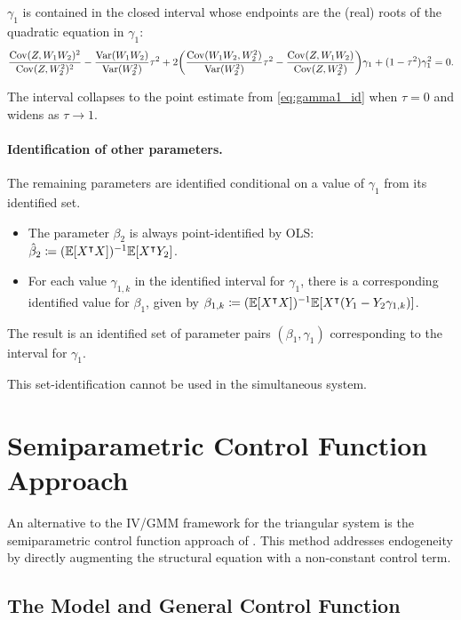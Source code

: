 \begin{theorem} \label{thm:bounds}
$\gamma_{1}$ is contained in the closed interval whose endpoints
are the (real) roots of the quadratic equation in $\gamma_{1}$:
\[
\frac{\operatorname{Cov}(Z,W_{1}W_{2})^{2}}{\operatorname{Cov}(Z,W_{2}^{2})^{2}}-\frac{\operatorname{Var}(W_{1}W_{2})}{\operatorname{Var}(W_{2}^{2})}\tau^{2}+2\!\left(\frac{\operatorname{Cov}(W_{1}W_{2},W_{2}^{2})}{\operatorname{Var}(W_{2}^{2})}\tau^{2}-\frac{\operatorname{Cov}(Z,W_{1}W_{2})}{\operatorname{Cov}(Z,W_{2}^{2})}\right)\!\gamma_{1}+(1-\tau^{2})\gamma_{1}^{2}=0.
\]
\end{theorem} The interval collapses to the point estimate from \eqref{eq:gamma1_id}
when $\tau=0$ and widens as $\tau\to1$.

\paragraph{Identification of other parameters.}

The remaining parameters are identified conditional on a value of
$\gamma_{1}$ from its identified set.
\begin{itemize}
\itemsep0pt
\item The parameter $\beta_{2}$ is always point-identified by OLS: $\hat{\beta}_{2}\coloneqq(\mathbb{E}[X^{\intercal} X])^{-1}\mathbb{E}[X^{\intercal} Y_{2}]$.
\item For each value $\gamma_{1,k}$ in the identified interval for $\gamma_{1}$,
there is a corresponding identified value for $\beta_{1}$, given
by $\beta_{1,k}\coloneqq(\mathbb{E}[X^{\intercal} X])^{-1}\mathbb{E}[X^{\intercal}(Y_{1}-Y_{2}\gamma_{1,k})]$.
\end{itemize}
The result is an identified set of parameter pairs $(\beta_{1},\gamma_{1})$
corresponding to the interval for $\gamma_{1}$.

This set-identification cannot be used in the simultaneous system.

\section{Semiparametric Control Function Approach}

An alternative to the IV/GMM framework for the triangular system is the semiparametric control function approach of \textcite{klein2010estimating}. This method addresses endogeneity by directly augmenting the structural equation with a non-constant control term.

\subsection{The Model and General Control Function}

